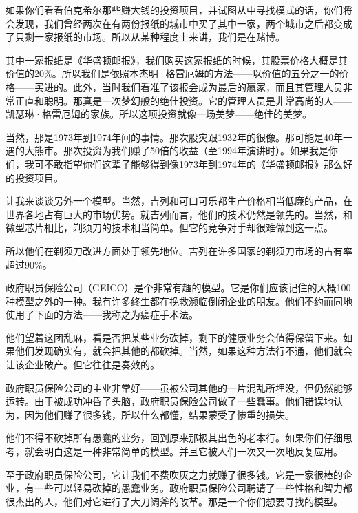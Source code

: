 如果你们看看伯克希尔那些赚大钱的投资项目，并试图从中寻找模式的话，你们将会发现，我们曾经两次在有两份报纸的城市中买了其中一家，两个城市之后都变成了只剩一家报纸的市场。所以从某种程度上来讲，我们是在赌博。
\par

其中一家报纸是《华盛顿邮报》，我们购买这家报纸的时候，其股票价格大概是其价值的20\%。所以我们是依照本杰明·格雷厄姆的方法——以价值的五分之一的价格——买进的。此外，当时我们看准了该报会成为最后的赢家，而且其管理人员非常正直和聪明。那真是一次梦幻般的绝佳投资。它的管理人员是非常高尚的人——凯瑟琳·格雷厄姆的家族。所以这项投资就像一场美梦——绝佳的美梦。
\par

当然，那是1973年到1974年间的事情。那次股灾跟1932年的很像。那可能是40年一遇的大熊市。那次投资为我们赚了50倍的收益（至1994年演讲时）。如果我是你们，我可不敢指望你们这辈子能够得到像1973年到1974年的《华盛顿邮报》那么好的投资项目。
\par

让我来谈谈另外一个模型。当然，吉列和可口可乐都生产价格相当低廉的产品，在世界各地占有巨大的市场优势。就吉列而言，他们的技术仍然是领先的。当然，和微型芯片相比，剃须刀的技术相当简单。但它的竞争对手却很难做到这一点。
\par

所以他们在剃须刀改进方面处于领先地位。吉列在许多国家的剃须刀市场的占有率超过90\%。
\par

政府职员保险公司（GEICO）是个非常有趣的模型。它是你们应该记住的大概100种模型之外的一种。我有许多终生都在挽救濒临倒闭企业的朋友。他们不约而同地使用了下面的方法——我称之为癌症手术法。
\par

他们望着这团乱麻，看是否把某些业务砍掉，剩下的健康业务会值得保留下来。如果他们发现确实有，就会把其他的都砍掉。当然，如果这种方法行不通，他们就会让该企业破产。但它往往是奏效的。
\par

政府职员保险公司的主业非常好——虽被公司其他的一片混乱所埋没，但仍然能够运转。由于被成功冲昏了头脑，政府职员保险公司做了一些蠢事。他们错误地认为，因为他们赚了很多钱，所以什么都懂，结果蒙受了惨重的损失。
\par

他们不得不砍掉所有愚蠢的业务，回到原来那极其出色的老本行。如果你们仔细思考，就会明白这是一种非常简单的模型。并且它被人们一次又一次地反复应用。
\par

至于政府职员保险公司，它让我们不费吹灰之力就赚了很多钱。它是一家很棒的企业，有一些可以轻易砍掉的愚蠢业务。政府职员保险公司聘请了一些性格和智力都很杰出的人，他们对它进行了大刀阔斧的改革。那是一个你们想要寻找的模型。
\par

